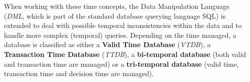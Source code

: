 When working with these time concepts, the Data Manipulation Language (\emph{DML}, which is part of the standard database querying language SQL) is extended to deal with possible temporal inconsistencies within the data and to handle more complex (temporal) queries. 
Depending on the time managed, a database is classified as either a \textbf{Valid Time Database} (\emph{VTDB}), a \textbf{Transaction Time Database} (\emph{TTDB}), a \textbf{bi-temporal database} (both valid and transaction time are managed) or a \textbf{tri-temporal database} (valid time, transaction time and decision time are managed).

	
	
